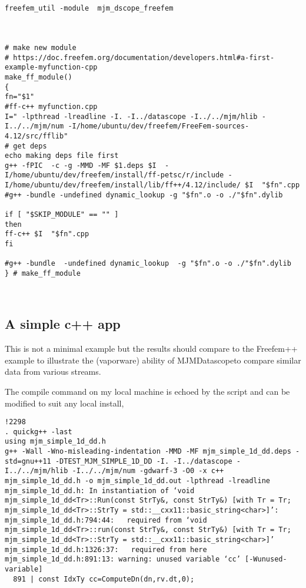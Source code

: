 \documentclass[aps,secnumarabic,balancelastpage,amsmath,amssymb,nofootinbib]{revtex4}
\newcommand{\mjmprod}{MJMDatascope}
\begin{document}
\begin{lstlisting}


freefem_util -module  mjm_dscope_freefem



# make new module 
# https://doc.freefem.org/documentation/developers.html#a-first-example-myfunction-cpp
make_ff_module()
{
fn="$1"
#ff-c++ myfunction.cpp
I=" -lpthread -lreadline -I. -I../datascope -I../../mjm/hlib -I../../mjm/num -I/home/ubuntu/dev/freefem/FreeFem-sources-4.12/src/fflib"
# get deps
echo making deps file first 
g++ -fPIC  -c -g -MMD -MF $1.deps $I  -I/home/ubuntu/dev/freefem/install/ff-petsc/r/include -I/home/ubuntu/dev/freefem/install/lib/ff++/4.12/include/ $I  "$fn".cpp 
#g++ -bundle -undefined dynamic_lookup -g "$fn".o -o ./"$fn".dylib

if [ "$SKIP_MODULE" == "" ]
then
ff-c++ $I  "$fn".cpp
fi

#g++ -bundle  -undefined dynamic_lookup  -g "$fn".o -o ./"$fn".dylib
} # make_ff_module



\end{lstlisting}


\subsection{ A simple c++ app }

This is not a minimal example but the results should compare
to the Freefem++ example to illustrate the (vaporware) ability
of \mjmprod to compare similar data from various streams.

The compile command on my local machine is echoed by the script
and can be modified to suit any local install,  

\begin{lstlisting}
!2298
. quickg++ -last
using mjm_simple_1d_dd.h
g++ -Wall -Wno-misleading-indentation -MMD -MF mjm_simple_1d_dd.deps -std=gnu++11 -DTEST_MJM_SIMPLE_1D_DD -I. -I../datascope -I../../mjm/hlib -I../../mjm/num -gdwarf-3 -O0 -x c++ mjm_simple_1d_dd.h -o mjm_simple_1d_dd.out -lpthread -lreadline
mjm_simple_1d_dd.h: In instantiation of ‘void mjm_simple_1d_dd<Tr>::Run(const StrTy&, const StrTy&) [with Tr = Tr; mjm_simple_1d_dd<Tr>::StrTy = std::__cxx11::basic_string<char>]’:
mjm_simple_1d_dd.h:794:44:   required from ‘void mjm_simple_1d_dd<Tr>::run(const StrTy&, const StrTy&) [with Tr = Tr; mjm_simple_1d_dd<Tr>::StrTy = std::__cxx11::basic_string<char>]’
mjm_simple_1d_dd.h:1326:37:   required from here
mjm_simple_1d_dd.h:891:13: warning: unused variable ‘cc’ [-Wunused-variable]
  891 | const IdxTy cc=ComputeDn(dn,rv.dt,0);

\end{lstlisting}
\end{document}
